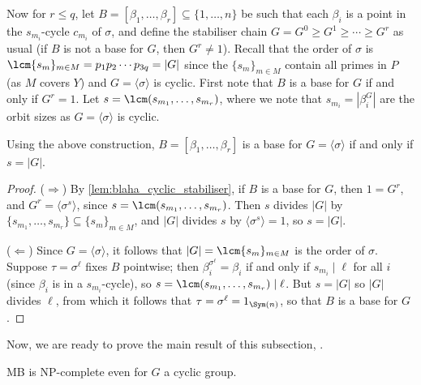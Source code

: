Now for $r \leq q$, let $B = [\beta_1,\dotsc,\beta_r] \subseteq \{1,\dotsc,n\}$ be such that each $\beta_i$ is a point in the $s_{m_i}$-cycle $c_{m_i}$ of $\sigma$, and define the stabiliser chain $G = G^0 \geq G^1 \geq \dotsb \geq G^r$ as usual (if $B$ is not a base for $G$, then $G^r \neq 1$). Recall that the order of $\sigma$ is $\lcm\{s_m\}_{m \in M} = p_1 p_2 \dotsb p_{3q} = |G|$ since the $\{s_m\}_{m \in M}$ contain all primes in $P$ (as $M$ covers $Y$) and $G = \langle \sigma \rangle$ is cyclic. First note that $B$ is a base for $G$ if and only if $G^r = 1$. Let $s = \lcm(s_{m_1},\dotsc,s_{m_r})$, where we note that $s_{m_i} = |\beta_i^G|$ are the orbit sizes as $G = \langle \sigma \rangle$ is cyclic. 

\begin{lemma}\label{lem:blaha_cyclic_base}
    Using the above construction, $B = [\beta_1,\dotsc,\beta_r]$ is a base for $G = \langle \sigma \rangle$ if and only if $s = |G|$.
\end{lemma}

\begin{proof}
    ($\Longrightarrow$) By \autoref{lem:blaha_cyclic_stabiliser}, if $B$ is a base for $G$, then $1 = G^r$, and $G^r = \langle \sigma^s\rangle$, since $s = \lcm(s_{m_1},\dotsc,s_{m_r})$. Then $s$ divides $|G|$ by $\{s_{m_1},\dotsc,s_{m_r}\} \subseteq \{s_m\}_{m \in M}$, and $|G|$ divides $s$ by $\langle \sigma^s \rangle = 1$, so $s = |G|$.

    ($\Longleftarrow$) Since $G = \langle \sigma \rangle$, it follows that $|G| = \lcm\{s_m\}_{m \in M}$ is the order of $\sigma$. Suppose $\tau = \sigma^\ell$ fixes $B$ pointwise; then $\beta_i^{\sigma^\ell} = \beta_i$ if and only if $s_{m_i} \mid \ell$ for all $i$ (since $\beta_i$ is in a $s_{m_i}$-cycle), so $s = \lcm(s_{m_1},\dotsc,s_{m_r}) \mid \ell$. But $s = |G|$ so $|G|$ divides $\ell$, from which it follows that $\tau = \sigma^\ell = 1_{\Sym(n)}$, so that $B$ is a base for $G$.
\end{proof}

Now, we are ready to prove the main result of this subsection, .

\begin{theorem}[Blaha, 1992]\label{thm:blaha_cyclic_NP_complete}
    MB is NP-complete even for $G$ a cyclic group.
\end{theorem}

